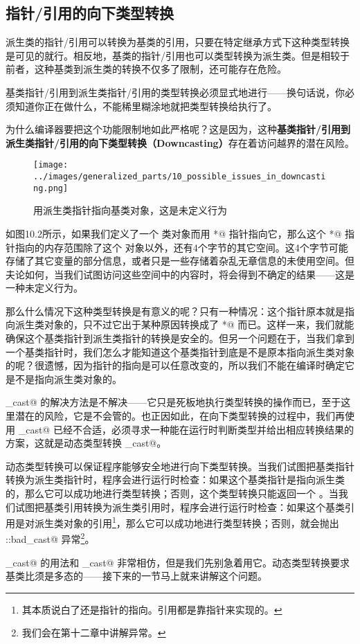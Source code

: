 \subsection*{指针/引用的向下类型转换}
派生类的指针/引用可以转换为基类的引用，只要在特定继承方式下这种类型转换是可见的就行。相反地，基类的指针/引用也可以类型转换为派生类。但是相较于前者，这种基类到派生类的转换不仅多了限制，还可能存在危险。\par
基类指针/引用到派生类指针/引用的类型转换必须显式地进行——换句话说，你必须知道你正在做什么，不能稀里糊涂地就把类型转换给执行了。\par
为什么编译器要把这个功能限制地如此严格呢？这是因为，这种\textbf{基类指针/引用到派生类指针/引用的向下类型转换（Downcasting）}存在着访问越界的潜在风险。\par
\begin{figure}[htbp]
    \centering
    \texttt{[image: ../images/generalized\_parts/10\_possible\_issues\_in\_downcasting.png]}
    \caption{用派生类指针指向基类对象，这是未定义行为}
\end{figure}
如图10.2所示，如果我们定义了一个 \lstinline@Base@ 类对象而用 \lstinline@Derived*@ 指针指向它，那么这个 \lstinline@Derived*@ 指针指向的内存范围除了这个 \lstinline@Base@ 对象以外，还有4个字节的其它空间。这4个字节可能存储了其它变量的部分信息，或者只是一些存储着杂乱无章信息的未使用空间。但夫论如何，当我们试图访问这些空间中的内容时，将会得到不确定的结果——这是一种未定义行为。\par
那么什么情况下这种类型转换是有意义的呢？只有一种情况：这个指针原本就是指向派生类对象的，只不过它出于某种原因转换成了 \lstinline@Base*@ 而已。这样一来，我们就能确保这个基类指针到派生类指针的转换是安全的。但另一个问题在于，当我们拿到一个基类指针时，我们怎么才能知道这个基类指针到底是不是原本指向派生类对象的呢？很遗憾，因为指针的指向是可以任意改变的，所以我们不能在编译时确定它是不是指向派生类对象的。\par
\lstinline@static_cast@ 的解决方法是不解决——它只是死板地执行类型转换的操作而已，至于这里潜在的风险，它是不会管的。也正因如此，在向下类型转换的过程中，我们再使用 \lstinline@static_cast@ 已经不合适，必须寻求一种能在运行时判断类型并给出相应转换结果的方案，这就是动态类型转换 \lstinline@dynamic_cast@。\par
动态类型转换可以保证程序能够安全地进行向下类型转换。当我们试图把基类指针转换为派生类指针时，程序会进行运行时检查：如果这个基类指针是指向派生类的，那么它可以成功地进行类型转换；否则，这个类型转换只能返回一个 \lstinline@nullptr@。当我们试图把基类引用转换为派生类引用时，程序会进行运行时检查：如果这个基类引用是对派生类对象的引用\footnote{其本质说白了还是指针的指向。引用都是靠指针来实现的。}，那么它可以成功地进行类型转换；否则，就会抛出 \lstinline@std::bad_cast@ 异常\footnote{我们会在第十二章中讲解异常。}。\par
\lstinline@dynamic_cast@ 的用法和 \lstinline@static_cast@ 非常相仿，但是我们先别急着用它。动态类型转换要求基类比须是多态的——接下来的一节马上就来讲解这个问题。\par
